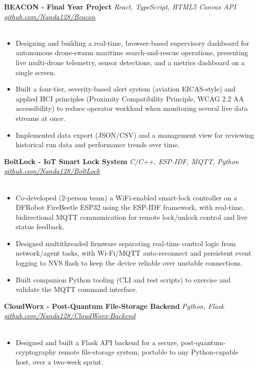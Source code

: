 \documentclass[10pt,a4paper]{article}
\newcommand{\cvProject}[3]{%
  \noindent\textbf{#1} \hfill \textit{\small #2} \\
  {\small #3} \\[-2pt]
}
\begin{document}
\cvProject{BEACON - Final Year Project}{React, TypeScript, HTML5 Canvas API \textbar{} \href{https://github.com/Nanda128/Beacon}{github.com/Nanda128/Beacon}}{}
\begin{itemize}
    \item Designing and building a real-time, browser-based supervisory dashboard for autonomous drone-swarm maritime search-and-rescue operations, presenting live multi-drone telemetry, sensor detections, and a metrics dashboard on a single screen.
    \item Built a four-tier, severity-based alert system (aviation EICAS-style) and applied HCI principles (Proximity Compatibility Principle, WCAG 2.2 AA accessibility) to reduce operator workload when monitoring several live data streams at once.
    \item Implemented data export (JSON/CSV) and a management view for reviewing historical run data and performance trends over time.
\end{itemize}

\vspace{1.5pt}

\cvProject{BoltLock - IoT Smart Lock System}{C/C++, ESP-IDF, MQTT, Python \textbar{} \href{https://github.com/Nanda128/BoltLock}{github.com/Nanda128/BoltLock}}{}
\begin{itemize}
    \item Co-developed (2-person team) a WiFi-enabled smart-lock controller on a DFRobot FireBeetle ESP32 using the ESP-IDF framework, with real-time, bidirectional MQTT communication for remote lock/unlock control and live status feedback.
    \item Designed multithreaded firmware separating real-time control logic from network/agent tasks, with Wi-Fi/MQTT auto-reconnect and persistent event logging to NVS flash to keep the device reliable over unstable connections.
    \item Built companion Python tooling (CLI and test scripts) to exercise and validate the MQTT command interface.
\end{itemize}

\vspace{1.5pt}

\cvProject{CloudWorx - Post-Quantum File-Storage Backend}{Python, Flask \textbar{} \href{https://github.com/Nanda128/CloudWorx-Backend}{github.com/Nanda128/CloudWorx-Backend}}{}
\begin{itemize}
    \item Designed and built a Flask API backend for a secure, post-quantum-cryptography remote file-storage system, portable to any Python-capable host, over a two-week sprint.
\end{itemize}
\end{document}
